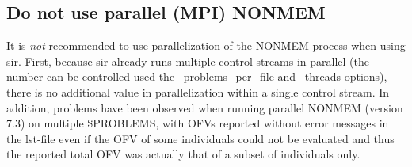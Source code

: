 \subsection*{Do not use parallel (MPI) NONMEM}
It is \emph{not} recommended to use parallelization of the NONMEM process when using sir.
First, because sir already runs multiple control streams in parallel (the number can be controlled
used the –problems\_per\_file and –threads options), there is no additional value in parallelization within
a single control stream.
In addition, problems have been observed when running parallel NONMEM (version 7.3) on multiple \$PROBLEMS,
with OFVs reported without error messages in the lst-file even if the OFV of some individuals could not be evaluated and
thus the reported total OFV was actually that of a subset of individuals only.





